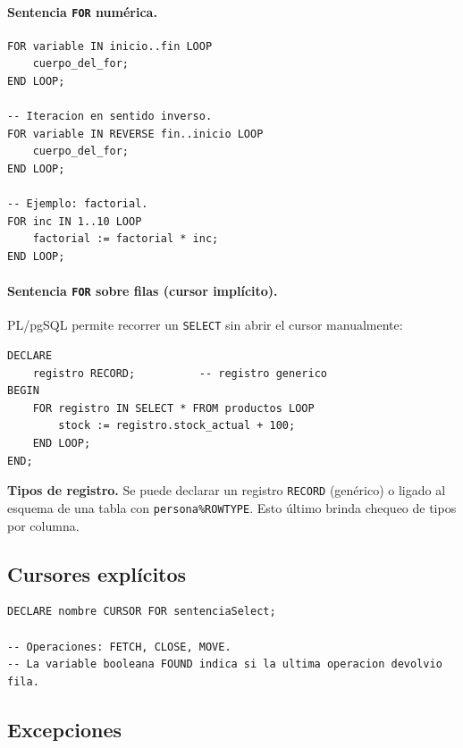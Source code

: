 \documentclass[11pt,a4paper]{article}
\begin{document}
\paragraph{Sentencia \texttt{FOR} numérica.}

\begin{lstlisting}
FOR variable IN inicio..fin LOOP
    cuerpo_del_for;
END LOOP;

-- Iteracion en sentido inverso.
FOR variable IN REVERSE fin..inicio LOOP
    cuerpo_del_for;
END LOOP;

-- Ejemplo: factorial.
FOR inc IN 1..10 LOOP
    factorial := factorial * inc;
END LOOP;
\end{lstlisting}

\paragraph{Sentencia \texttt{FOR} sobre filas (cursor implícito).}
PL/pgSQL permite recorrer un \texttt{SELECT} sin abrir el cursor
manualmente:

\begin{lstlisting}
DECLARE
    registro RECORD;          -- registro generico
BEGIN
    FOR registro IN SELECT * FROM productos LOOP
        stock := registro.stock_actual + 100;
    END LOOP;
END;
\end{lstlisting}

\begin{nota}
\textbf{Tipos de registro.} Se puede declarar un registro
\texttt{RECORD} (genérico) o ligado al esquema de una tabla con
\texttt{persona\%ROWTYPE}. Esto último brinda chequeo de tipos por
columna.
\end{nota}

\subsection{Cursores explícitos}

\begin{lstlisting}
DECLARE nombre CURSOR FOR sentenciaSelect;

-- Operaciones: FETCH, CLOSE, MOVE.
-- La variable booleana FOUND indica si la ultima operacion devolvio fila.
\end{lstlisting}

\subsection{Excepciones}
\end{document}
